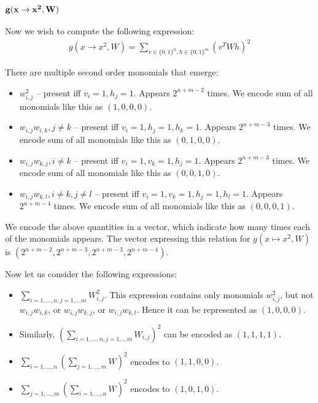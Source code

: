 \subsubsection{$\bf g(x \rightarrow x^2, W)$}

Now we wish to compute the following expression: 
\begin{gather*}
	g(x \rightarrow x^2, W) = \sum_{v \in \{0, 1\}^n, h \in \{0, 1\}^m} (v^TWh)^2
\end{gather*}

There are multiple second order monomials that emerge: 

\begin{itemize}
	\item $w_{i,j}^2$ -- present iff $v_i = 1, h_j = 1$. Appears $2^{n + m - 2}$ times. We encode sum of all monomials like this as $(1, 0, 0, 0)$.
	\item $w_{i,j} w_{i, k}, j \neq k$ -- present iff $v_i = 1, h_j = 1, h_k = 1$. Appears $2^{n + m - 3}$ times. We encode sum of all monomials like this as $(0, 1, 0, 0)$.	
	\item $w_{i,j} w_{k, j}, i \neq k$ -- present iff $v_i = 1, v_k = 1, h_j = 1$. Appears $2^{n + m - 3}$ times. We encode sum of all monomials like this as $(0, 0, 1, 0)$.
	\item $w_{i,j} w_{k, l}, i \neq k, j \neq l$ -- present iff $v_i = 1, v_k = 1, h_j = 1, h_l = 1$. Appears $2^{n + m - 4}$ times. We encode sum of all monomials like this as $(0, 0, 0, 1)$.
\end{itemize}
We encode the above quantities in a vector, which indicate how many times
each of the monomials 
appears. The vector expressing this relation for $g(x \mapsto x^2, W)$
is $(2^{n + m - 2}, 2^{n + m - 3}, 2^{n + m - 3}, 2^{n + m - 4})$.

Now let us consider the following expressions: 
\begin{itemize}
 \item $\sum_{i = 1, \dots, n, j = 1, \dots m} W_{i, j}^2$. 
This expression contains only monomials $w_{i, j}^2$, but not $w_{i,
  j} w_{i, k}$, or $w_{i, j} w_{k, j}$, or $w_{i, j} w_{k, l}$. Hence it can be represented as $(1, 0, 0, 0)$.
 \item Similarly, $(\sum_{i = 1, \dots, n, j = 1, \dots m} W_{i,
     j})^2$ can be encoded as $(1, 1, 1, 1)$.
 \item $\sum_{i = 1, \dots, n}(\sum_{j = 1, \dots, m} W)^2$ encodes to
   $(1, 1, 0, 0)$. 
 \item $\sum_{j = 1, \dots, m}(\sum_{i = 1, \dots, n} W)^2$ encodes to
   $(1, 0, 1, 0)$.
\end{itemize}
 
